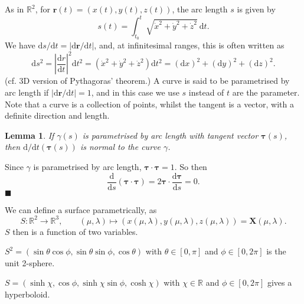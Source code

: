 \documentclass[letter-paper]{tufte-book}
\newtheorem{lemma}[theorem]{\color{pastel-blue}Lemma}
\newenvironment{proof}[1][Proof]{\begin{trivlist}
\item[\hskip \labelsep {\bfseries #1}]}{\end{trivlist}}
\newenvironment{example}[1][Example]{\begin{trivlist}
\item[\hskip \labelsep {\bfseries #1}]}{\end{trivlist}}
\newcommand{\Xb}{\boldsymbol{X}}
\newcommand{\qed}{\hfill$\blacksquare$}
\begin{document}
As in $\mathbb{R}^2$, for $\boldsymbol{r}(t)=(x(t),y(t),z(t))$, the arc length
$s$ is given by
\begin{equation}
	s(t)=\int_{t_0}^{t}\sqrt{\dot{x}^2+\dot{y}^2+\dot{z}^2}\ \mathrm{d}t.
\end{equation}
We have $\mathrm{d}s/\mathrm{d}t=|\mathrm{d}\boldsymbol{r}/\mathrm{d}t|$, and,
at infinitesimal ranges, this is often written as
\begin{equation}
	\mathrm{d}s^2=\left|\frac{\mathrm{d}r}{\mathrm{d}t}\right|^2 \mathrm{d}t^2
	=(\dot{x}^2+\dot{y}^2+\dot{z}^2)\mathrm{d}t^2
	=(\mathrm{d}x)^2+(\mathrm{d}y)^2+(\mathrm{d}z)^2.
\end{equation}
(cf. 3D version of Pythagoras' theorem.) A curve is said to be parametrised by
arc length if $|\mathrm{d}\boldsymbol{r}/\mathrm{d}t|=1$, and in this case we
use $s$ instead of $t$ are the parameter. Note that a curve is a collection of
points, whilst the tangent is a vector, with a definite direction and length.

\begin{lemma}
	If $\gamma(s)$ is parametrised by arc length with tangent vector
	$\boldsymbol{\tau}(s)$, then $\mathrm{d}/\mathrm{d}t(\boldsymbol{\tau}(s))$
	is normal to the curve $\gamma$.
\end{lemma}
\begin{proof}
	Since $\gamma$ is parametrised by arc length,
	$\boldsymbol{\tau}\cdot\boldsymbol{\tau}=1$. So then
	\begin{equation*}
		\frac{\mathrm{d}}{\mathrm{d}s}(\boldsymbol{\tau}\cdot\boldsymbol{\tau})
		=2\boldsymbol{\tau}\cdot\frac{\mathrm{d}\boldsymbol{\tau}}{\mathrm{d}s}
		=0.
	\end{equation*}
	\qed
\end{proof}

We can define a surface parametrically, as
\begin{equation*}
	S:\mathbb{R}^2\rightarrow \mathbb{R}^3,\qquad
	(\mu,\lambda)\mapsto(x(\mu,\lambda),y(\mu,\lambda),z(\mu,\lambda))
	=\Xb(\mu,\lambda).
\end{equation*}
$S$ then is a function of two variables.
\begin{example}
	$S^2=(\sin\theta\cos\phi,\sin\theta\sin\phi,\cos\theta)$ with
	$\theta\in[0,\pi]$ and $\phi\in[0,2\pi]$ is the unit 2-sphere.
\end{example}
\begin{example}
	$S=(\sinh\chi,\cos\phi,\sinh\chi\sin\phi,\cosh\chi)$ with
	$\chi\in\mathbb{R}$ and $\phi\in[0,2\pi]$ gives a hyperboloid.
\end{example}
\end{document}
